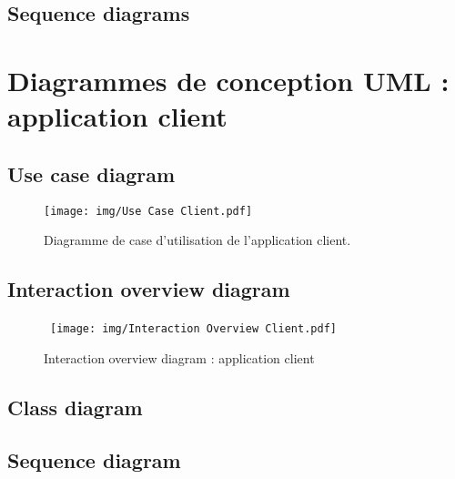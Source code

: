\documentclass[]{report}
\begin{document}


\newpage

\subsection{Sequence diagrams}



\newpage




\section{Diagrammes de conception UML : application client}



\subsection{Use case diagram}



\begin{figure}[h]
	\centering\texttt{[image: img/Use Case Client.pdf]}
	\caption{Diagramme de case d'utilisation de l'application client.}
\end{figure}

\newpage

\subsection{Interaction overview diagram}



\begin{figure}[h!]
\hbox{
	\centering\texttt{[image: img/Interaction Overview Client.pdf]}
}
\caption{Interaction overview diagram : application client}
\end{figure}

\newpage


\subsection{Class diagram}



\newpage

\subsection{Sequence diagram}
\end{document}
